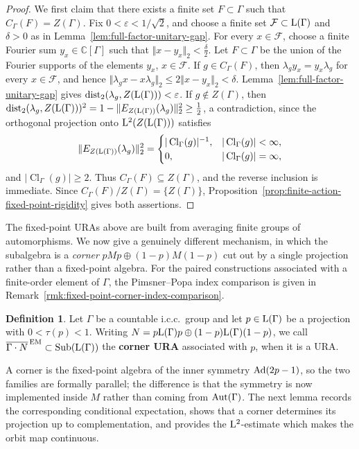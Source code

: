 \documentclass[12pt]{amsart} %
\theoremstyle{plain}
\theoremstyle{definition}
\newtheorem{definition}[theorem]{Definition}
\newcommand{\LL}{{\rm L}}
\newcommand{\Aut}{{\rm Aut}}
\newcommand{\Ad}{{\rm Ad}}
\DeclareMathOperator{\Sub}{Sub}
\newcommand{\dist}{\mathrm{dist}}
\begin{document}
\begin{proof}
\noindent We first claim that there exists a finite set
$F\subset\Gamma$ such that $C_\Gamma(F)=Z(\Gamma)$. Fix $0<\varepsilon<1/\sqrt2$, and choose a finite set
$\mathcal F\subset\LL(\Gamma)$ and $\delta>0$ as in
Lemma~\ref{lem:full-factor-unitary-gap}. For every $x\in\mathcal F$, choose
a finite Fourier sum $y_x\in\mathbb C[\Gamma]$ such that $\Vert x-y_x\Vert_2<\frac{\delta}{2}$. Let $F\subset\Gamma$ be the union of the Fourier supports of the elements
$y_x$, $x\in\mathcal F$. If $g\in C_\Gamma(F)$, then
$\lambda_gy_x=y_x\lambda_g$ for every $x\in\mathcal F$, and hence $\Vert\lambda_gx-x\lambda_g\Vert_2
\leq2\Vert x-y_x\Vert_2
<\delta$. Lemma~\ref{lem:full-factor-unitary-gap} gives $\dist_2(\lambda_g,Z(\LL(\Gamma)))<\varepsilon$.
If $g\notin Z(\Gamma)$, then $\dist_2(\lambda_g,Z(\LL(\Gamma)))^2
=
1-\Vert E_{Z(\LL(\Gamma))}(\lambda_g)\Vert_2^2
\geq\frac12$,
a contradiction, since the orthogonal projection onto
$\LL^2(Z(\LL(\Gamma)))$ satisfies
$$
\Vert E_{Z(\LL(\Gamma))}(\lambda_g)\Vert_2^2
=
\begin{cases}
|\operatorname{Cl}_\Gamma(g)|^{-1},
&|\operatorname{Cl}_\Gamma(g)|<\infty,\\
0,
&|\operatorname{Cl}_\Gamma(g)|=\infty,
\end{cases}
$$
and $|\operatorname{Cl}_\Gamma(g)|\geq2$. Thus
$C_\Gamma(F)\subseteq Z(\Gamma)$, and the reverse
inclusion is immediate.
\medskip
\noindent Since
$C_\Gamma(F)/Z(\Gamma)=\{Z(\Gamma)\}$,
Proposition~\ref{prop:finite-action-fixed-point-rigidity} gives both
assertions.\end{proof}
\noindent The fixed-point URAs above are built from averaging finite groups
of automorphisms. We now give a genuinely different mechanism, in which
the subalgebra is a \emph{corner} $pMp\oplus(1-p)M(1-p)$ cut out by a single
projection rather than a fixed-point algebra. For the paired
constructions associated with a finite-order element of $\Gamma$, the
Pimsner--Popa index comparison is given in
Remark~\ref{rmk:fixed-point-corner-index-comparison}.
\begin{definition}\label{def:corner-ura}
Let $\Gamma$ be a countable i.c.c.\ group and let $p\in\LL(\Gamma)$ be a
projection with $0<\tau(p)<1$. Writing
$N=p\LL(\Gamma)p\oplus(1-p)\LL(\Gamma)(1-p)$, we call
$\overline{\Gamma\cdot N}^{\,\mathrm{EM}}\subset\Sub(\LL(\Gamma))$ the
\textbf{corner URA} associated with $p$, when it is a URA.
\end{definition}

\noindent A corner is the fixed-point algebra of the inner symmetry
$\Ad(2p-1)$, so the two families are formally parallel; the difference is that
the symmetry is now implemented inside $M$ rather than coming from
$\Aut(\Gamma)$. The next lemma records the corresponding conditional
expectation, shows that a corner determines its projection up to
complementation, and provides the $\LL^2$-estimate which makes the orbit map
continuous.
\medskip
\end{document}

